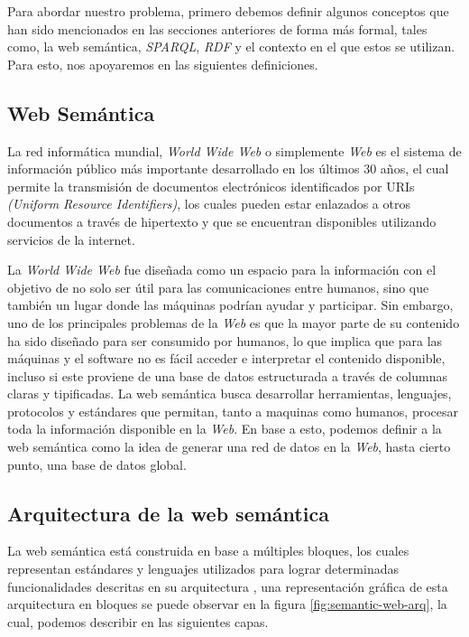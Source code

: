 
Para abordar nuestro problema, primero debemos definir algunos conceptos que han
sido mencionados en las secciones anteriores de forma más formal, tales como, la
web semántica, \textit{SPARQL}, \textit{RDF} y el contexto en el que estos se
utilizan. Para esto, nos apoyaremos en las siguientes definiciones.

\subsection{Web Semántica}

La red informática mundial, \textit{World Wide Web} o simplemente \textit{Web}
es el sistema de información público más importante desarrollado en los últimos
30 años, el cual permite la transmisión de documentos electrónicos identificados
por URIs \textit{(Uniform Resource Identifiers)}, los cuales pueden estar
enlazados a otros documentos a través de hipertexto y que se encuentran
disponibles utilizando servicios de la internet.

La \textit{World Wide Web} fue diseñada como un espacio para la información con
el objetivo de no solo ser útil para las comunicaciones entre humanos, sino que
también un lugar donde las máquinas podrían ayudar y participar. Sin embargo,
uno de los principales problemas de la \textit{Web} es que la mayor parte de su
contenido ha sido diseñado para ser consumido por humanos, lo que implica que
para las máquinas y el software no es fácil acceder e interpretar el contenido
disponible, incluso si este proviene de una base de datos estructurada a través
de columnas claras y tipificadas. La web semántica busca desarrollar
herramientas, lenguajes, protocolos y estándares que permitan, tanto a maquinas
como humanos, procesar toda la información disponible en la \textit{Web}. En
base a esto, podemos definir a la web semántica como la idea de generar una red
de datos en la \textit{Web}, hasta cierto punto, una base de datos global.
\cite{berners1998semantic}

\subsection{Arquitectura de la web semántica}

La web semántica está construida en base a múltiples bloques, los cuales
representan estándares y lenguajes utilizados para lograr determinadas
funcionalidades descritas en su arquitectura \cite{harth2011semantic}, una
representación gráfica de esta arquitectura en bloques se puede observar en la
figura \ref{fig:semantic-web-arq}, la cual, podemos describir en las siguientes
capas.

